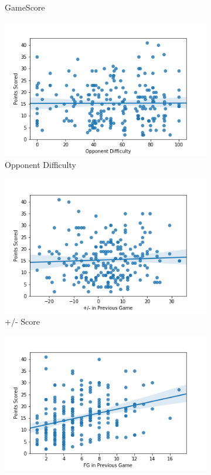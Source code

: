 \documentclass[a4paper,11pt,twoside]{article}
\begin{document}
\begin{figure} [h!]
\begin{subfigure}[b]{0.47\textwidth}
    \caption{GameScore}
    \label{fig:3}
  \end{subfigure}
  \begin{subfigure}[b]{0.47\textwidth}
    \includegraphics[width=\textwidth]{../opp.png}
    \caption{Opponent Difficulty}
    \label{fig:1}
  \end{subfigure}
  \begin{subfigure}[b]{0.47\textwidth}
    \includegraphics[width=\textwidth]{../pminus_pts.png}
    \caption{+/- Score}
    \label{fig:2}
  \end{subfigure}
 \begin{subfigure}[b]{0.47\textwidth}
    \includegraphics[width=\textwidth]{../fgoals_pts.png}

\end{subfigure}
\end{figure}
\end{document}
